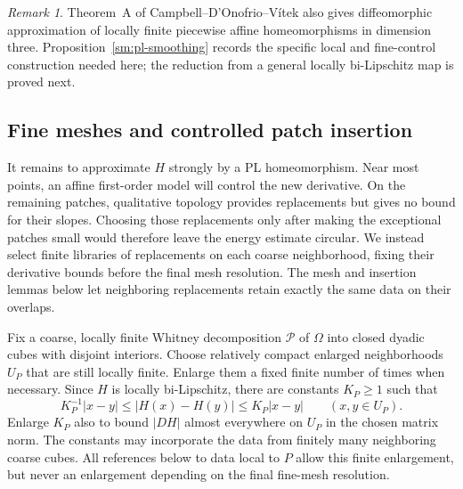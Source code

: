 \documentclass[11pt]{article}
\numberwithin{equation}{section}
\theoremstyle{definition}
\theoremstyle{remark}
\newtheorem{remark}[theorem]{Remark}
\begin{document}
\begin{remark}
Theorem~A of Campbell--D'Onofrio--V\'itek
\cite{CampbellDOnofrioVitek2026} also gives diffeomorphic
approximation of locally finite piecewise affine homeomorphisms
in dimension three.  Proposition~\ref{sm:pl-smoothing} records the
specific local and fine-control construction needed here; the
reduction from a general locally bi-Lipschitz map is proved next.
\end{remark}

\subsection{Fine meshes and controlled patch insertion}

It remains to approximate $H$ strongly by a PL homeomorphism.
Near most points, an affine first-order model will control the new
derivative. On the remaining patches, qualitative topology provides
replacements but gives no bound for their slopes. Choosing those
replacements only after making the exceptional patches small would
therefore leave the energy estimate circular. We instead select finite
libraries of replacements on each coarse neighborhood, fixing their
derivative bounds before the final mesh resolution. The mesh and
insertion lemmas below let neighboring replacements retain exactly
the same data on their overlaps.

Fix a coarse, locally finite Whitney decomposition $\mathcal P$ of
$\Omega$ into closed dyadic cubes with disjoint interiors.  Choose
relatively compact enlarged neighborhoods $U_P$ that are still locally
finite.  Enlarge them a fixed finite number of times when necessary.
Since $H$ is locally bi-Lipschitz, there are constants $K_P\ge1$ such
that
\begin{equation}
 \label{sm:coarse-bilip}
 K_P^{-1}|x-y|\le |H(x)-H(y)|\le K_P|x-y|
 \qquad(x,y\in U_P).
\end{equation}
Enlarge $K_P$ also to bound $|DH|$ almost everywhere on $U_P$ in the
chosen matrix norm.  The constants may incorporate the data from finitely many neighboring
coarse cubes.  All references below to data local to $P$ allow this
finite enlargement, but never an enlargement depending on the final
fine-mesh resolution.
\end{document}
